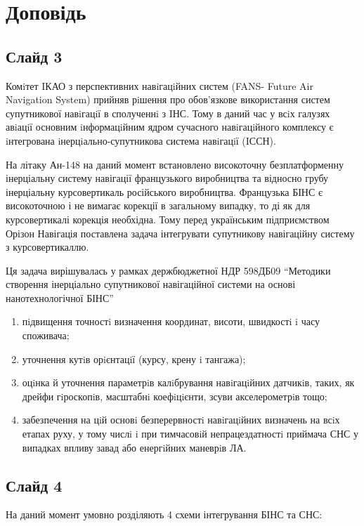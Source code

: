 \documentclass[ukrainian,utf8,simple,floatsubsection, hpadding=1mm,equationsubsection,]{eskdtext}
\begin{document}
\footnotesize
\section*{Доповідь}
\subsection*{Слайд 3}

Комiтет IКАО з перспективних навiгацiйних систем (FANS- Future Air Navigation System) прийняв рiшення про обов’язкове використання систем супутникової навiгацiї в сполученнi з IНС. Тому в даний час у всiх галузях авiацiї
основним iнформацiйним ядром сучасного навiгацiйного комплексу є iнтегрована iнерцiально-супутникова система навiгацiї (IССН).

На літаку Ан-148 на даний момент встановлено високоточну безплатформенну інерціальну систему навігації французького виробництва та відносно грубу інерціальну курсовертикаль російського виробництва. Французька БІНС є високоточною і не вимагає корекції в загальному випадку, то ді як для курсовертикалі корекція необхідна. Тому перед українським підприємством Орізон Навігація поставлена задача інтегрувати супутникову навігаційну систему з курсовертикаллю.

Ця задача вирішувалась у рамках держбюджетної НДР 598ДБ09 ``Методики створення інерціально супутникової навігаційної системи на основі нанотехнологічної БІНС”

\begin{enumerate}
\item  пiдвищення точностi визначення координат, висоти, швидкостi i часу споживача;
\item  уточнення кутiв орiєнтацiї (курсу, крену i тангажа);
\item  оцiнка й уточнення параметрiв калiбрування навiгацiйних датчикiв,
таких, як дрейфи гiроскопiв, масштабнi коефiцiєнти, зсуви акселерометрiв тощо;
\item  забезпечення на цiй основi безперервностi навiгацiйних визначень на всiх етапах руху, у тому числi i при тимчасовiй непрацездатностi приймача СНС у випадках впливу завад або енергiйних маневрiв ЛА.
\end{enumerate}

\subsection*{Слайд 4}
На даний момент умовно розділяють 4 схеми інтегрування БІНС та СНС:
\end{document}
